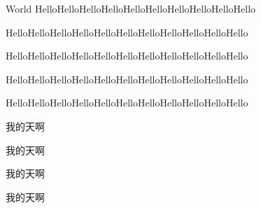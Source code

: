 \documentclass{myarticle}
\begin{document}
\begin{section}{World}
HelloHelloHelloHelloHelloHelloHelloHelloHelloHello

HelloHelloHelloHelloHelloHelloHelloHelloHelloHelloHello

HelloHelloHelloHelloHelloHelloHelloHelloHelloHelloHello

HelloHelloHelloHelloHelloHelloHelloHelloHelloHelloHello

HelloHelloHelloHelloHelloHelloHelloHelloHelloHelloHello

\songti 我的天啊

\kaiti 我的天啊

\heiti 我的天啊

\fangsong 我的天啊

\end{section}
\end{document}

